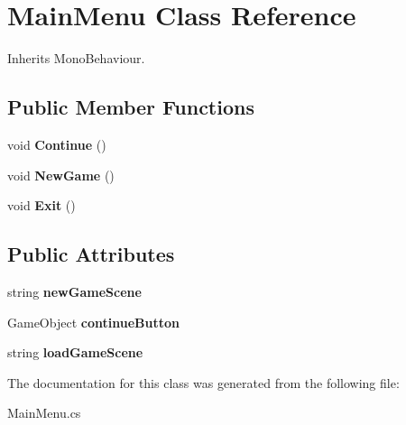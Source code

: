 \hypertarget{class_main_menu}{}\section{Main\+Menu Class Reference}
\label{class_main_menu}


Inherits Mono\+Behaviour.

\subsection*{Public Member Functions}
\begin{DoxyCompactItemize}
\item 
\mbox{\label{class_main_menu_aa9db4c20ba13ea077ab2fca568e1b0c9}} 
void {\bfseries Continue} ()
\item 
\mbox{\label{class_main_menu_a0b9845990e48b948575d2bf6f4dad24d}} 
void {\bfseries New\+Game} ()
\item 
\mbox{\label{class_main_menu_a2a6f329d1d69aa2ccd1703b061c4d51e}} 
void {\bfseries Exit} ()
\end{DoxyCompactItemize}
\subsection*{Public Attributes}
\begin{DoxyCompactItemize}
\item 
\mbox{\label{class_main_menu_a653e036059ac8fc3048c5bc130aac2e0}} 
string {\bfseries new\+Game\+Scene}
\item 
\mbox{\label{class_main_menu_a3c956a34110a6d6da4f7909f837d0d05}} 
Game\+Object {\bfseries continue\+Button}
\item 
\mbox{\label{class_main_menu_a891d157e430357ae136478cfd6577dce}} 
string {\bfseries load\+Game\+Scene}
\end{DoxyCompactItemize}


The documentation for this class was generated from the following file\+:\begin{DoxyCompactItemize}
\item 
Main\+Menu.\+cs\end{DoxyCompactItemize}
